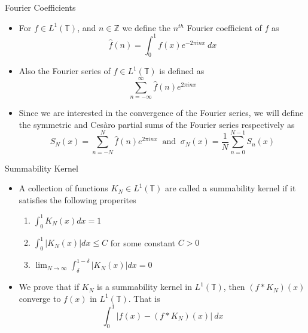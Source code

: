 \documentclass[compress]{beamer}
\newcommand{\Z}{\mathbb Z}
\newcommand{\T}{\mathbb T}
\begin{document}
\begin{frame}{Fourier Coefficients}
  \begin{itemize}
    \item For $f \in L^1(\T)$, and $n \in \Z$ we define the $n^{th}$ Fourier coefficient of $f$ as $$\hat{f}(n) = \int_0^1 f(x)e^{-2\pi i n x} \ dx $$
    \pause
    \item Also the Fourier series of $f \in L^1(\T)$ is defined as $$\sum_{n=-\infty }^\infty \hat{f}(n) e^{2\pi in x} $$
    \pause
    \item Since we are interested in the convergence of the Fourier series, we will define the symmetric and Ces\`aro partial sums of the Fourier series respectively as $$ S_N(x) = \sum_{n=-N}^N \hat{f}(n)e^{2\pi inx} \ \text{ and } \  \sigma_N(x) = \frac{1}{N}\sum_{n=0}^{N-1} S_n(x)$$
   \end{itemize}
\end{frame}

\begin{frame}{Summability Kernel}
  \begin{itemize}
    \item A collection of functions $K_N \in L^1(\T)$ are called a summability kernel if it satisfies the following properites
      \begin{enumerate}
        \item $\int_{0}^{1}K_N(x)dx = 1$
        \item $\int_{0}^{1}\lvert K_N(x)\rvert dx \le C$ for some constant $C>0$
        \item $\lim_{N\to\infty} \int_{\delta}^{1-\delta}\lvert K_N(x)\rvert dx= 0$
      \end{enumerate}
    \pause
    \item We prove that if $K_N$ is a summability kernel in $L^1(\T)$, then $(f*K_N)(x)$ converge to $f(x)$ in $L^1(\T)$. That is 
      \begin{equation}
        \int_0^1 \lvert f(x) - (f*K_N)(x) \rvert \ dx
        \label{eq:summability_kernel_converge}
      \end{equation}
  \end{itemize}
\end{frame}
\end{document}
